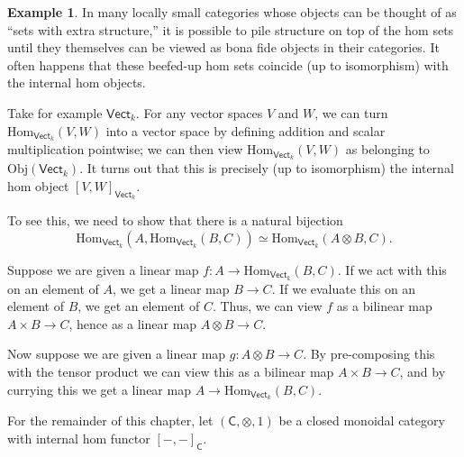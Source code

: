 \documentclass[a4paper,10pt]{scrreprt}
\newcommand{\Obj}{\mathrm{Obj}}
\newcommand{\Hom}{\mathrm{Hom}}
\theoremstyle{definition}
\newtheorem{example}{Example}[section]
\theoremstyle{plain}
\theoremstyle{remark}
\begin{document}
\begin{example}
  In many locally small categories whose objects can be thought of as ``sets with extra structure,'' it is possible to pile structure on top of the hom sets until they themselves can be viewed as bona fide objects in their categories. It often happens that these beefed-up hom sets coincide (up to isomorphism) with the internal hom objects.

  Take for example $\mathsf{Vect}_{k}$. For any vector spaces $V$ and $W$, we can turn $\Hom_{\mathsf{Vect}_{k}}(V, W)$ into a vector space by defining addition and scalar multiplication pointwise; we can then view $\Hom_{\mathsf{Vect}_{k}}(V, W)$ as belonging to $\Obj(\mathsf{Vect}_{k})$. It turns out that this is precisely (up to isomorphism) the internal hom object $[V, W]_{\mathsf{Vect}_{k}}$.

  To see this, we need to show that there is a natural bijection 
  \begin{equation*}
    \Hom_{\mathsf{Vect}_{k}}(A, \Hom_{\mathsf{Vect}_{k}}(B, C)) \simeq \Hom_{\mathsf{Vect}_{k}}(A \otimes B, C).
  \end{equation*}

  Suppose we are given a linear map $f\colon A \to \Hom_{\mathsf{Vect}_{k}}(B, C)$. If we act with this on an element of $A$, we get a linear map $B \to C$. If we evaluate this on an element of $B$, we get an element of $C$. Thus, we can view $f$ as a bilinear map $A \times B \to C$, hence as a linear map $A \otimes B \to C$.

  Now suppose we are given a linear map $g\colon A \otimes B \to C$. By pre-composing this with the tensor product we can view this as a bilinear map $A \times B \to C$, and by currying this we get a linear map $A \to \Hom_{\mathsf{Vect}_{k}}(B, C)$.
\end{example}

For the remainder of this chapter, let $(\mathsf{C}, \otimes, 1)$ be a closed monoidal category with internal hom functor $[-,-]_{\mathsf{C}}$.
\end{document}
